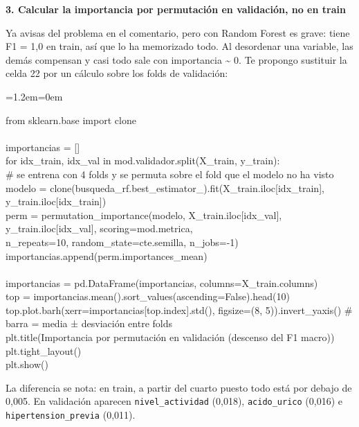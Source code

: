 \documentclass[11pt,a4paper]{article}
\newenvironment{codigo}
  {\par\smallskip\begin{list}{}{\leftmargin=1.2em\rightmargin=0em}\item\relax\ttfamily\scriptsize\raggedright}
  {\end{list}\smallskip}
\begin{document}
{\smallskip\noindent\textbf{3. Calcular la importancia por permutación en validación, no en train}\par
Ya avisas del problema en el comentario, pero con Random Forest es grave: tiene F1 = 1,0 en train, así que lo ha memorizado todo. Al desordenar una variable, las demás compensan y casi todo sale con importancia \textasciitilde{} 0. Te propongo sustituir la celda 22 por un cálculo sobre los folds de validación:

\begin{codigo}
from sklearn.base import clone \\{}
\mbox{} \\{}
importancias = [] \\{}
for idx\_\allowbreak{}train, idx\_\allowbreak{}val in mod.validador.split(X\_\allowbreak{}train, y\_\allowbreak{}train): \\{}
\hspace*{2.08em}\# se entrena con 4 folds y se permuta sobre el fold que el modelo no ha visto \\{}
\hspace*{2.08em}modelo = clone(busqueda\_\allowbreak{}rf.best\_\allowbreak{}estimator\_\allowbreak{}).fit(X\_\allowbreak{}train.iloc[idx\_\allowbreak{}train], y\_\allowbreak{}train.iloc[idx\_\allowbreak{}train]) \\{}
\hspace*{2.08em}perm = permutation\_\allowbreak{}importance(modelo, X\_\allowbreak{}train.iloc[idx\_\allowbreak{}val], y\_\allowbreak{}train.iloc[idx\_\allowbreak{}val], scoring=mod.metrica, \\{}
\hspace*{17.68em}n\_\allowbreak{}repeats=10, random\_\allowbreak{}state=cte.semilla, n\_\allowbreak{}jobs=-1) \\{}
\hspace*{2.08em}importancias.append(perm.importances\_\allowbreak{}mean) \\{}
\mbox{} \\{}
importancias = pd.DataFrame(importancias, columns=X\_\allowbreak{}train.columns) \\{}
top = importancias.mean().sort\_\allowbreak{}values(ascending=False).head(10) \\{}
top.plot.barh(xerr=importancias[top.index].std(), figsize=(8, 5)).invert\_\allowbreak{}yaxis()   \# barra = media ± desviación entre folds \\{}
plt.title(\textquotedbl{}Importancia por permutación en validación (descenso del F1 macro)\textquotedbl{}) \\{}
plt.tight\_\allowbreak{}layout() \\{}
plt.show()
\end{codigo}
La diferencia se nota: en train, a partir del cuarto puesto todo está por debajo de 0,005. En validación aparecen \texttt{nivel\_\allowbreak{}actividad} (0,018), \texttt{acido\_\allowbreak{}urico} (0,016) e \texttt{hipertension\_\allowbreak{}previa} (0,011).

}
\end{document}
